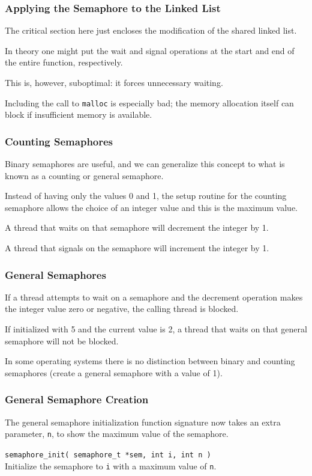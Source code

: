 \begin{frame}
\frametitle{Applying the Semaphore to the Linked List}

The critical section here just encloses the modification of the shared linked list. 

In theory one might put the wait and signal operations at the start and end of the entire function, respectively. 

This is, however, suboptimal: it forces unnecessary waiting. 

Including the call to \texttt{malloc} is especially bad; the memory allocation itself can block if insufficient memory is available. 

\end{frame}

\begin{frame}
\frametitle{Counting Semaphores}

Binary semaphores are useful, and we can generalize this concept to what is known as a \alert{counting} or \alert{general} semaphore. 

Instead of having only the values 0 and 1, the setup routine for the counting semaphore allows the choice of an integer value and this is the maximum value. 

A thread that waits on that semaphore will decrement the integer by 1.

A thread that signals on the semaphore will increment the integer by 1. 

\end{frame}


\begin{frame}
\frametitle{General Semaphores}

If a thread attempts to wait on a semaphore and the decrement operation makes the integer value zero or negative, the calling thread is blocked. 

If initialized with 5 and the current value is 2, a thread that waits on that general semaphore will not be blocked.

In some operating systems there is no distinction between binary and counting semaphores (create a general semaphore with a value of 1).

\end{frame}


\begin{frame}
\frametitle{General Semaphore Creation}

The general semaphore initialization function signature now takes an extra parameter, \texttt{n}, to show the maximum value of the semaphore.

\texttt{semaphore\_init( semaphore\_t *sem, int i, int n )}\\
Initialize the semaphore to \texttt{i} with a maximum value of \texttt{n}.


\end{frame}




